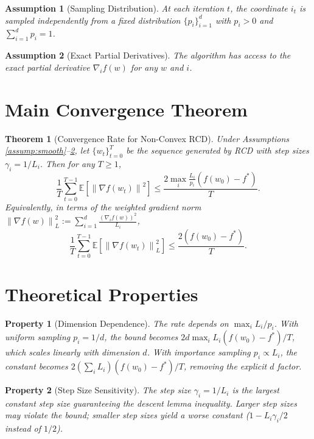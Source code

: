 \documentclass{article}
\newtheorem{assumption}{Assumption}
\newtheorem{theorem}{Theorem}
\newtheorem{property}{Property}
\newcommand{\E}{\mathbb{E}}
\newcommand{\norm}[1]{\left\|#1\right\|}
\begin{document}
\begin{assumption}[Sampling Distribution]
\label{assump:sampling}
At each iteration $t$, the coordinate $i_t$ is sampled independently from a fixed distribution $\{p_i\}_{i=1}^d$ with $p_i > 0$ and $\sum_{i=1}^d p_i = 1$.
\end{assumption}

\begin{assumption}[Exact Partial Derivatives]
\label{assump:exact}
The algorithm has access to the exact partial derivative $\nabla_i f(w)$ for any $w$ and $i$.
\end{assumption}

\section*{Main Convergence Theorem}

\begin{theorem}[Convergence Rate for Non-Convex RCD]
\label{thm:main}
Under Assumptions \ref{assump:smooth}--\ref{assump:exact}, let $\{w_t\}_{t=0}^T$ be the sequence generated by RCD with step sizes $\gamma_i = 1/L_i$. Then for any $T \ge 1$,
\begin{equation}
\frac{1}{T} \sum_{t=0}^{T-1} \E\left[ \norm{\nabla f(w_t)}^2 \right]
\le \frac{2 \max_{i} \frac{L_i}{p_i} \left( f(w_0) - f^* \right)}{T}.
\end{equation}
Equivalently, in terms of the weighted gradient norm $\norm{\nabla f(w)}_L^2 := \sum_{i=1}^d \frac{(\nabla_i f(w))^2}{L_i}$,
\begin{equation}
\frac{1}{T} \sum_{t=0}^{T-1} \E\left[ \norm{\nabla f(w_t)}_L^2 \right]
\le \frac{2 \left( f(w_0) - f^* \right)}{T}.
\end{equation}
\end{theorem}

\section*{Theoretical Properties}

\begin{property}[Dimension Dependence]
The rate depends on $\max_i L_i/p_i$. With uniform sampling $p_i = 1/d$, the bound becomes $2d \max_i L_i (f(w_0)-f^*)/T$, which scales linearly with dimension $d$. With importance sampling $p_i \propto L_i$, the constant becomes $2 (\sum_i L_i) (f(w_0)-f^*)/T$, removing the explicit $d$ factor.
\end{property}

\begin{property}[Step Size Sensitivity]
The step size $\gamma_i = 1/L_i$ is the largest constant step size guaranteeing the descent lemma inequality. Larger step sizes may violate the bound; smaller step sizes yield a worse constant ($1 - L_i\gamma_i/2$ instead of $1/2$).
\end{property}
\end{document}
